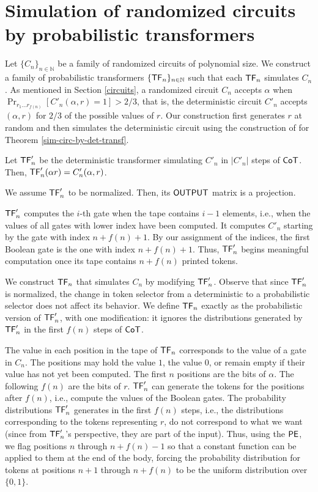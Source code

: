 \section{Simulation of randomized circuits by probabilistic transformers}\label{appendix:prob-lower-bound}

Let $\{C_n\}_{n\in\mathbb{N}}$ be a family of randomized circuits of polynomial size.
We construct a family of probabilistic transformers $\{\mathsf{TF}_n\}_{n \in \mathbb{N}}$ such that each $\mathsf{TF}_n$ simulates $C_n$.
As mentioned in Section \ref{circuits}, a randomized circuit $C_n$ accepts $\alpha$ when $\Pr_{r_1 \dots r_{f(n)}}[C'_n(\alpha, r) = 1] > 2/3$, that is, the deterministic circuit $C'_n$ accepts $(\alpha, r)$ for $2/3$ of the possible values of $r$.
Our construction first generates $r$ at random and then simulates the deterministic circuit using the construction of \citet{toyota} for Theorem \ref{sim-circ-by-det-transf}.


Let $\mathsf{TF}'_n$ be the deterministic transformer simulating $C'_n$ in $|C'_n|$ steps of $\mathsf{CoT}$.
Then, $\mathsf{TF}'_n(\alpha r) = C'_n(\alpha, r)$.

We assume $\mathsf{TF}'_n$ to be normalized.
Then, its $\mathsf{OUTPUT}$ matrix is a projection.

$\mathsf{TF}'_n$ computes the $i$-th gate when the tape contains $i-1$ elements, i.e., when the values of all gates with lower index have been computed.
It computes $C'_n$ starting by the gate with index $n+f(n)+1$.
By our assignment of the indices, the first Boolean gate is the one with index $n+f(n)+1$.
Thus, $\mathsf{TF}'_n$ begins meaningful computation once its tape contains $n+f(n)$ printed tokens.

\smallskip

We construct $\mathsf{TF}_n$ that simulates $C_n$ by modifying $\mathsf{TF}'_n$.
Observe that since $\mathsf{TF}'_n$ is normalized, the change in token selector from a deterministic to a probabilistic selector does not affect its behavior.
We define $\mathsf{TF}_n$ exactly as the probabilistic version of $\mathsf{TF}'_n$, with one modification: it ignores the distributions generated by $\mathsf{TF}'_n$ in the first $f(n)$ steps of $\mathsf{CoT}$.

The value in each position in the tape of $\mathsf{TF}_n$ corresponds to the value of a gate in $C_n$.
The positions may hold the value $1$, the value $0$, or remain empty if their value has not yet been computed.
The first $n$ positions are the bits of $\alpha$.
The following $f(n)$ are the bits of $r$.
$\mathsf{TF}'_n$ can generate the tokens for the positions after $f(n)$, i.e., compute the values of the Boolean gates.
The probability distributions $\mathsf{TF}'_n$ generates in the first $f(n)$ steps, i.e., the distributions corresponding to the tokens representing $r$, do not correspond to what we want (since from $\mathsf{TF}'_n$'s perspective, they are part of the input).
Thus, using the $\mathsf{PE}$, we flag positions $n$ through $n+f(n)-1$ so that a constant function can be applied to them at the end of the body, forcing the probability distribution for tokens at positions $n+1$ through $n+f(n)$ to be the uniform distribution over $\{0, 1\}$.


